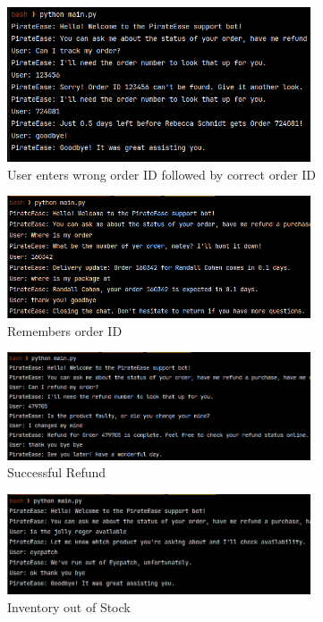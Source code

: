 \documentclass[11pt]{article}
\begin{document}
\begin{figure}[h!]
    \centering
    \includegraphics[width=0.8\textwidth]{wrong_then_right_order_id.png}
    \caption{User enters wrong order ID followed by correct order ID}
\end{figure}

\begin{figure}[h!]
    \centering
    \includegraphics[width=0.8\textwidth]{remembers_order_id.png}
    \caption{Remembers order ID}
\end{figure}

\begin{figure}[h!]
    \centering
    \includegraphics[width=0.8\textwidth]{successful_refund.png}
    \caption{Successful Refund}
\end{figure}

\begin{figure}[h!]
    \centering
    \includegraphics[width=0.8\textwidth]{inventory_out_of_stock.png}
    \caption{Inventory out of Stock}
\end{figure}
\end{document}
